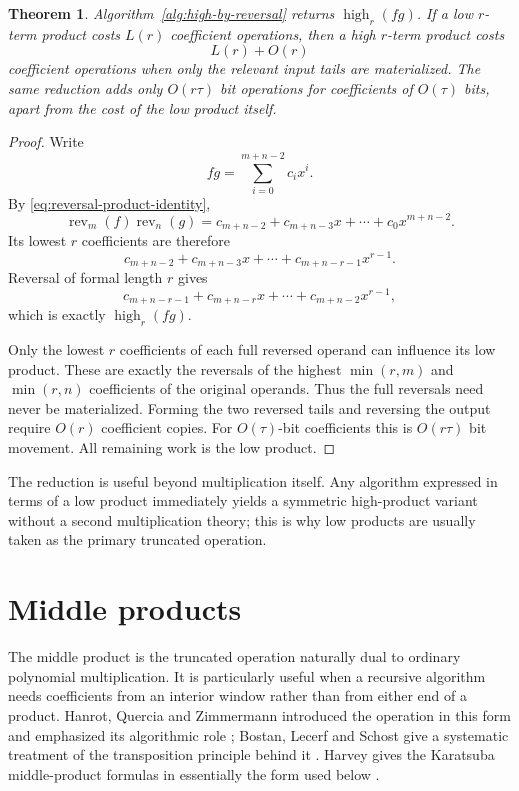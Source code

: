 \documentclass[11pt]{book}
\newtheorem{theorem}{Theorem}[section]
\theoremstyle{definition}
\begin{document}
\begin{theorem}\label{thm:high-by-reversal}
Algorithm~\ref{alg:high-by-reversal} returns
$\operatorname{high}_r(fg)$.  If a low $r$-term product costs $L(r)$
coefficient operations, then a high $r$-term product costs
\[
 L(r)+O(r)
\]
coefficient operations when only the relevant input tails are materialized.
The same reduction adds only $O(r\tau)$ bit operations for coefficients of
$O(\tau)$ bits, apart from the cost of the low product itself.
\end{theorem}

\begin{proof}
Write
\[
 fg=\sum_{i=0}^{m+n-2}c_ix^i.
\]
By \eqref{eq:reversal-product-identity},
\[
 \operatorname{rev}_m(f)\operatorname{rev}_n(g)
 =c_{m+n-2}+c_{m+n-3}x+\cdots+c_0x^{m+n-2}.
\]
Its lowest $r$ coefficients are therefore
\[
 c_{m+n-2}+c_{m+n-3}x+\cdots+c_{m+n-r-1}x^{r-1}.
\]
Reversal of formal length $r$ gives
\[
 c_{m+n-r-1}+c_{m+n-r}x+\cdots+c_{m+n-2}x^{r-1},
\]
which is exactly $\operatorname{high}_r(fg)$.

Only the lowest $r$ coefficients of each full reversed operand can influence
its low product.  These are exactly the reversals of the highest
$\min(r,m)$ and $\min(r,n)$ coefficients of the original operands.  Thus the
full reversals need never be materialized.  Forming the two reversed tails and
reversing the output require $O(r)$ coefficient copies.  For
$O(\tau)$-bit coefficients this is $O(r\tau)$ bit movement.  All remaining
work is the low product.
\end{proof}

The reduction is useful beyond multiplication itself.  Any algorithm expressed
in terms of a low product immediately yields a symmetric high-product variant
without a second multiplication theory; this is why low products are usually
taken as the primary truncated operation.


\section{Middle products}

The middle product is the truncated operation naturally dual to ordinary
polynomial multiplication.  It is particularly useful when a recursive
algorithm needs coefficients from an interior window rather than from either
end of a product.  Hanrot, Quercia and Zimmermann introduced the operation in
this form and emphasized its algorithmic role \cite{HanrotQuerciaZimmermann2004};
Bostan, Lecerf and Schost give a systematic treatment of the transposition
principle behind it \cite{BostanLecerfSchost2003}.  Harvey gives the
Karatsuba middle-product formulas in essentially the form used below
\cite{Harvey2012Middle}.
\end{document}
